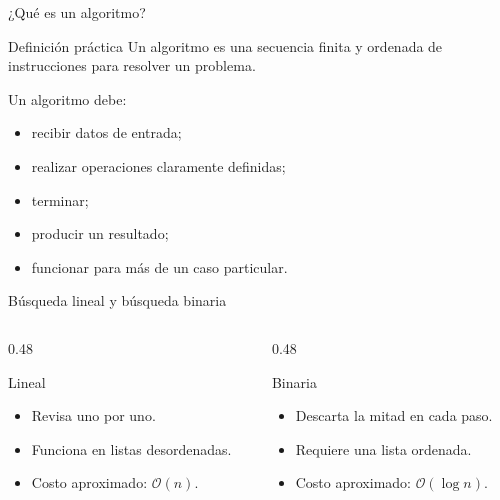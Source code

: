 \documentclass[10pt]{beamer}
\begin{document}
\begin{frame}{¿Qué es un algoritmo?}
  \begin{block}{Definición práctica}
    Un algoritmo es una secuencia finita y ordenada de instrucciones para resolver un problema.
  \end{block}

  Un algoritmo debe:
  \begin{itemize}
    \item recibir datos de entrada;
    \item realizar operaciones claramente definidas;
    \item terminar;
    \item producir un resultado;
    \item funcionar para más de un caso particular.
  \end{itemize}
\end{frame}

\begin{frame}{Búsqueda lineal y búsqueda binaria}
  \begin{columns}
    \begin{column}{0.48\textwidth}
      \begin{block}{Lineal}
        \begin{itemize}
          \item Revisa uno por uno.
          \item Funciona en listas desordenadas.
          \item Costo aproximado: \(\mathcal{O}(n)\).
        \end{itemize}
      \end{block}
    \end{column}
    \begin{column}{0.48\textwidth}
      \begin{block}{Binaria}
        \begin{itemize}
          \item Descarta la mitad en cada paso.
          \item Requiere una lista ordenada.
          \item Costo aproximado: \(\mathcal{O}(\log n)\).
        \end{itemize}
      \end{block}
    \end{column}
  \end{columns}
\end{frame}
\end{document}
